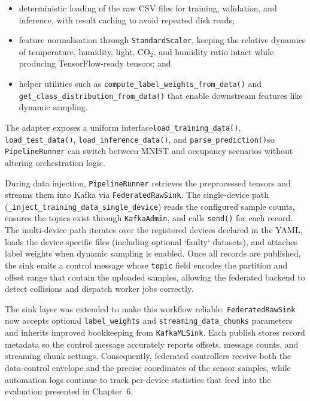 \begin{itemize}
    \item deterministic loading of the raw CSV files for training, validation, and inference, with result caching to avoid repeated disk reads;
    \item feature normalisation through \texttt{StandardScaler}, keeping the relative dynamics of temperature, humidity, light, CO$_2$, and humidity ratio intact while producing TensorFlow-ready tensors; and
    \item helper utilities such as \texttt{compute\_label\_weights\_from\_data()} and \texttt{get\_class\_distribution\_from\_data()} that enable downstream features like dynamic sampling.
\end{itemize}

The adapter exposes a uniform interface\textemdash\texttt{load\_training\_data()}, \texttt{load\_test\_data()}, \texttt{load\_inference\_data()}, and \texttt{parse\_prediction()}\textemdash so \texttt{PipelineRunner} can switch between MNIST and occupancy scenarios without altering orchestration logic.

During data injection, \texttt{PipelineRunner} retrieves the preprocessed tensors and streams them into Kafka via \texttt{FederatedRawSink}. The single-device path (\texttt{\_inject\_training\_data\_single\_device}) reads the configured sample counts, ensures the topics exist through \texttt{KafkaAdmin}, and calls \texttt{send()} for each record. The multi-device path iterates over the registered devices declared in the YAML, loads the device-specific files (including optional `faulty` datasets), and attaches label weights when dynamic sampling is enabled. Once all records are published, the sink emits a control message whose \texttt{topic} field encodes the partition and offset range that contain the uploaded samples, allowing the federated backend to detect collisions and dispatch worker jobs correctly.

The sink layer was extended to make this workflow reliable. \texttt{FederatedRawSink} now accepts optional \texttt{label\_weights} and \texttt{streaming\_data\_chunks} parameters and inherits improved bookkeeping from \texttt{KafkaMLSink}. Each publish stores record metadata so the control message accurately reports offsets, message counts, and streaming chunk settings. Consequently, federated controllers receive both the data-control envelope and the precise coordinates of the sensor samples, while automation logs continue to track per-device statistics that feed into the evaluation presented in Chapter~6.


